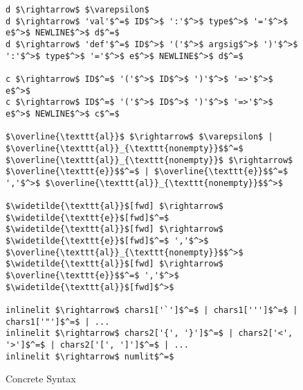 \begin{figure}
\begin{lstlisting}[mathescape]
d $\rightarrow$ $\varepsilon$
d $\rightarrow$ 'val'$^=$ ID$^>$ ':'$^>$ type$^>$ '='$^>$ e$^>$ NEWLINE$^>$ d$^=$
d $\rightarrow$ 'def'$^=$ ID$^>$ '('$^>$ argsig$^>$ ')'$^>$ ':'$^>$ type$^>$ '='$^>$ e$^>$ NEWLINE$^>$ d$^=$

c $\rightarrow$ ID$^=$ '('$^>$ ID$^>$ ')'$^>$ '=>'$^>$ e$^>$
c $\rightarrow$ ID$^=$ '('$^>$ ID$^>$ ')'$^>$ '=>'$^>$ e$^>$ NEWLINE$^>$ c$^=$

$\overline{\texttt{al}}$ $\rightarrow$ $\varepsilon$ | $\overline{\texttt{al}}_{\texttt{nonempty}}$$^=$
$\overline{\texttt{al}}_{\texttt{nonempty}}$ $\rightarrow$ $\overline{\texttt{e}}$$^=$ | $\overline{\texttt{e}}$$^=$ ','$^>$ $\overline{\texttt{al}}_{\texttt{nonempty}}$$^>$

$\widetilde{\texttt{al}}$[fwd] $\rightarrow$ $\widetilde{\texttt{e}}$[fwd]$^=$
$\widetilde{\texttt{al}}$[fwd] $\rightarrow$ $\widetilde{\texttt{e}}$[fwd]$^=$ ','$^>$ $\overline{\texttt{al}}_{\texttt{nonempty}}$$^>$
$\widetilde{\texttt{al}}$[fwd] $\rightarrow$ $\overline{\texttt{e}}$$^=$ ','$^>$ $\widetilde{\texttt{al}}$[fwd]$^>$

inlinelit $\rightarrow$ chars1['`']$^=$ | chars1[''']$^=$ | chars1['"']$^=$ | ...
inlinelit $\rightarrow$ chars2['{', '}']$^=$ | chars2['<', '>']$^=$ | chars2['[', ']']$^=$ | ...
inlinelit $\rightarrow$ numlit$^=$
\end{lstlisting}
\caption{Concrete Syntax}
\label{f-grammar}
\end{figure}

